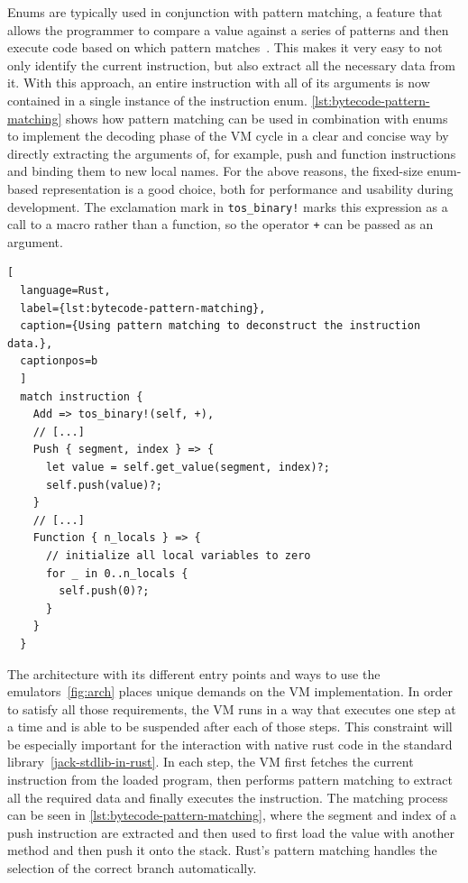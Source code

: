 Enums are typically used in conjunction with pattern matching, a feature that allows the programmer to compare a value against a series of patterns and then execute code based on which pattern matches~\cite[Chapter~6.2]{klabnik2019rust}.
This makes it very easy to not only identify the current instruction, but also extract all the necessary data from it.
With this approach, an entire instruction with all of its arguments is now contained in a single instance of the instruction enum.
\cref{lst:bytecode-pattern-matching} shows how pattern matching can be used in combination with enums to implement the decoding phase of the VM cycle in a clear and concise way by directly extracting the arguments of, for example, push and function instructions and binding them to new local names.
For the above reasons, the fixed-size enum-based representation is a good choice, both for performance and usability during development.
The exclamation mark in \verb+tos_binary!+ marks this expression as a call to a macro rather than a function, so the operator \verb*=+= can be passed as an argument.
\begin{lstlisting}[
  language=Rust,
  label={lst:bytecode-pattern-matching},
  caption={Using pattern matching to deconstruct the instruction data.},
  captionpos=b
  ]
  match instruction {
    Add => tos_binary!(self, +),
    // [...]
    Push { segment, index } => {
      let value = self.get_value(segment, index)?;
      self.push(value)?;
    }
    // [...]
    Function { n_locals } => {
      // initialize all local variables to zero
      for _ in 0..n_locals {
        self.push(0)?;
      }
    }
  }
\end{lstlisting}

\label{step-by-step}
The architecture with its different entry points and ways to use the emulators~\ref{fig:arch} places unique demands on the VM implementation.
In order to satisfy all those requirements, the VM runs in a way that executes one step at a time and is able to be suspended after each of those steps.
This constraint will be especially important for the interaction with native rust code in the standard library~\ref{jack-stdlib-in-rust}.
In each step, the VM first fetches the current instruction from the loaded program, then performs pattern matching to extract all the required data and finally executes the instruction.
The matching process can be seen in \cref{lst:bytecode-pattern-matching}, where the segment and index of a push instruction are extracted and then used to first load the value with another method and then push it onto the stack.
Rust's pattern matching handles the selection of the correct branch automatically.

